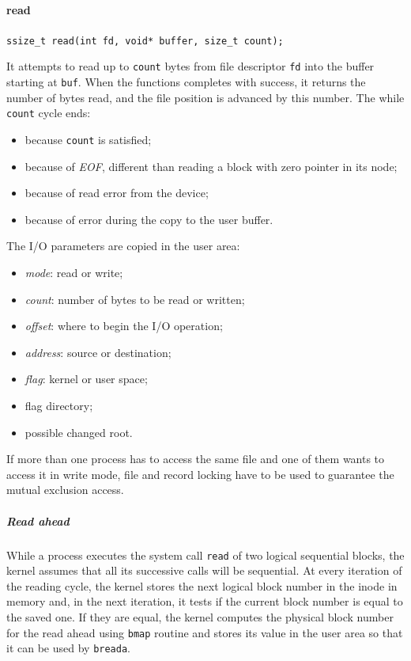 \paragraph{read}
\texttt{ssize\_t read(int fd, void* buffer, size\_t count);}

It attempts to read up to \texttt{count} bytes from file descriptor \texttt{fd} into the buffer starting at \texttt{buf}. When the functions completes with success, it returns the number of bytes read, and the file position is advanced by this number. The while \texttt{count} cycle ends:
\begin{itemize}
\item because \texttt{count} is satisfied;
\item because of \emph{EOF}, different than reading a block with zero pointer in its node;
\item because of read error from the device;
\item because of error during the copy to the user buffer.
\end{itemize}
The I/O parameters are copied in the user area:
\begin{itemize}
\item \emph{mode}: read or write;
\item \emph{count}: number of bytes to be read or written;
\item \emph{offset}: where to begin the I/O operation;
\item \emph{address}: source or destination;
\item \emph{flag}: kernel or user space;
\item flag directory;
\item possible changed root.
\end{itemize}
If more than one process has to access the same file and one of them wants to access it in write mode, file and record locking have to be used to guarantee the mutual exclusion access.

\subparagraph{Read ahead}
While a process executes the system call \texttt{read} of two logical sequential blocks, the kernel assumes that all its successive calls will be sequential. At every iteration of the reading cycle, the kernel stores the next logical block number in the inode in memory and, in the next iteration, it tests if the current block number is equal to the saved one. If they are equal, the kernel computes the physical block number for the read ahead using \texttt{bmap} routine and stores its value in the user area so that it can be used by \texttt{breada}.

